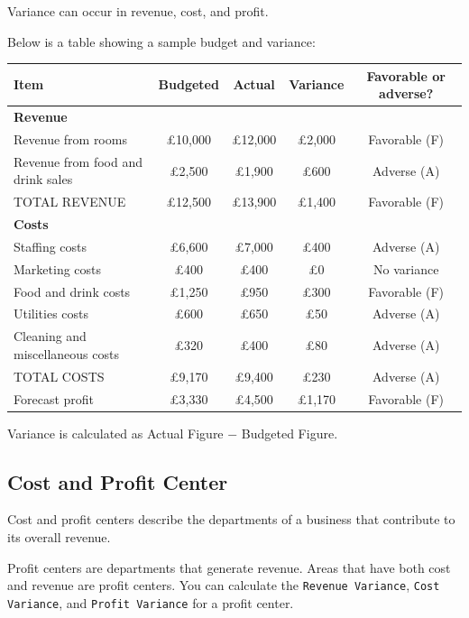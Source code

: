 \documentclass{standalone}
\begin{document}
Variance can occur in revenue, cost, and profit.

Below is a table showing a sample budget and variance:

\begin{tabular}{l c c c c}
    Item                              & Budgeted & Actual  & Variance & Favorable or adverse? \\
    \hline
    \textbf{Revenue}                  &          &         &          & \\
    Revenue from rooms                & £10,000  & £12,000 & £2,000   & Favorable (F)             \\
    Revenue from food and drink sales & £2,500   & £1,900  & £600     & Adverse (A)               \\
    TOTAL REVENUE                     & £12,500  & £13,900 & £1,400   & Favorable (F)             \\
    \hline
    \textbf{Costs}                    &          &         &          & \\
    Staffing costs                    & £6,600   & £7,000  & £400     & Adverse (A)               \\
    Marketing costs                   & £400     & £400    & £0       & No variance               \\
    Food and drink costs              & £1,250   & £950    & £300     & Favorable (F)             \\
    Utilities costs                   & £600     & £650    & £50      & Adverse (A)               \\
    Cleaning and miscellaneous costs  & £320     & £400    & £80      & Adverse (A)               \\
    \hline
    TOTAL COSTS                       & £9,170   & £9,400  & £230     & Adverse (A)               \\
    Forecast profit                   & £3,330   & £4,500  & £1,170   & Favorable (F)
\end{tabular}

Variance is calculated as Actual Figure $-$ Budgeted Figure.

\subsection{Cost and Profit Center}
Cost and profit centers describe the departments of a business that contribute to its overall revenue.

Profit centers are departments that generate revenue.
Areas that have both cost and revenue are profit centers.
You can calculate the \texttt{Revenue Variance}, \texttt{Cost Variance}, and \texttt{Profit Variance} for a profit center.
\end{document}
